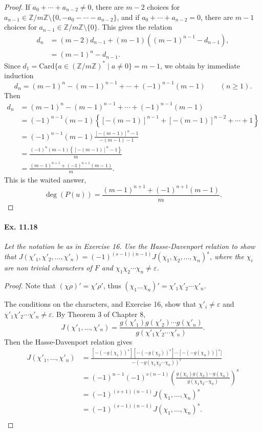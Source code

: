 \documentclass[11pt,a4paper]{article}
\newcommand{\Z}{\mathbb{Z}}
\begin{document}
\begin{proof}
If $a_0+ \cdots + a_{n-2} \ne 0$, there are $m-2$ choices for $a_{n-1} \in \Z/m\Z \setminus \{0, -a_0-\cdots -a_{n-2}\}$, and if $a_0+ \cdots + a_{n-2} = 0$, there are $m-1$ choices for $a_{n-1} \in \Z/m\Z \setminus \{0\}$. This gives the relation
\begin{align*}
d_n &= (m-2) d_{n-1} + (m-1) ((m-1)^{n-1} -d_{n-1}), \\
&=  (m-1)^n -d_{n-1}.
\end{align*}
Since $d_1 = \mathrm{Card}\{a \in (\Z/m\Z)^* \mid a \ne 0\} = m-1$, we obtain by immediate induction
$$d_n = (m-1)^n - (m-1)^{n-1} + \cdots + (-1)^{n-1}(m-1)\qquad (n\geq 1).$$
Then 
\begin{align*}
d_n &= (m-1)^n - (m-1)^{n-1} + \cdots + (-1)^{n-1}(m-1)\\
&=(-1)^{n-1} (m-1)\left\{ [-(m-1)]^{n-1} + [-(m-1)]^{n-2} + \cdots + 1\right\}\\
&=(-1)^{n-1} (m-1) \frac{[-(m-1)]^{n} - 1}{-(m-1) - 1}\\
&=\frac{(-1)^n (m-1) \left\{[-(m-1)]^{n} - 1\right\}}{m}\\
&=\frac{(m-1)^{n+1} + (-1)^{n+1}(m-1)}{m}.
\end{align*}
This is the waited answer,
$$\deg(P(u)) = \frac{(m-1)^{n+1} + (-1)^{n+1}(m-1)}{m}.$$
\end{proof}


\paragraph{Ex. 11.18}{\it Let the notation be as in Exercise 16. Use the Hasse-Davenport relation to show that $J(\chi'_1,\chi'_2,\ldots,\chi'_n) = (-1)^{(s-1)(n-1)} J(\chi_1,\chi_2,\ldots,\chi_n)^s$, where the $\chi_i$ are non trivial characters of $F$ and $\chi_1\chi_2\cdots \chi_n \ne \varepsilon$.
}

\begin{proof} Note that $(\chi \rho)' = \chi' \rho'$, thus $(\chi_1 \ldots \chi_n)'= \chi'_1 \chi'_2\cdots \chi'_n$.

The conditions on the characters, and Exercise 16,  show that $\chi'_i \ne \varepsilon$ and $\chi'_1\chi'_2\cdots \chi'_n \ne \varepsilon$. By Theorem 3 of Chapter 8,
$$J(\chi'_1,\ldots,\chi'_n) = \frac{g(\chi'_1)g(\chi'_2) \cdots g(\chi'_n)}{g(\chi'_1 \chi'_2\cdots \chi'_n)}.$$
Then the Hasse-Davenport relation gives
\begin{align*}
J(\chi'_1,\ldots,\chi'_n) &= \frac{[-(-g(\chi_1))^s] [-(-g(\chi_2))^s] \cdots[- (-g(\chi_n))]^s]}{-(-g(\chi_1 \chi_2 \cdots \chi_n))^s}\\
&=(-1)^{n-1}(-1)^{s(n-1)} \left(\frac{g(\chi_1)g(\chi_2) \cdots g(\chi_n)}{g(\chi_1 \chi_2\cdots \chi_n)}\right)^s\\
&=(-1)^{(s+1)(n-1)}  J(\chi_1,\ldots,\chi_n)^s\\
&=(-1)^{(s-1)(n-1)}  J(\chi_1,\ldots,\chi_n)^s.\\
\end{align*}
\end{proof}
\end{document}
